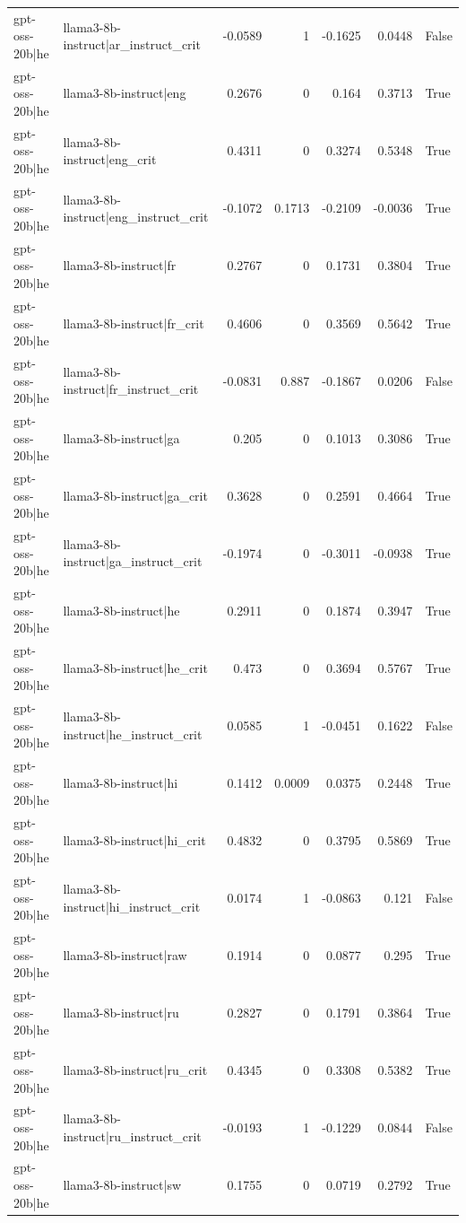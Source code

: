 \begin{table}
\begin{tabular}{l l r r r r l}
gpt-oss-20b|he & llama3-8b-instruct|ar_instruct_crit & -0.0589 & 1 & -0.1625 & 0.0448 & False \\
gpt-oss-20b|he & llama3-8b-instruct|eng & 0.2676 & 0 & 0.164 & 0.3713 & True \\
gpt-oss-20b|he & llama3-8b-instruct|eng_crit & 0.4311 & 0 & 0.3274 & 0.5348 & True \\
gpt-oss-20b|he & llama3-8b-instruct|eng_instruct_crit & -0.1072 & 0.1713 & -0.2109 & -0.0036 & True \\
gpt-oss-20b|he & llama3-8b-instruct|fr & 0.2767 & 0 & 0.1731 & 0.3804 & True \\
gpt-oss-20b|he & llama3-8b-instruct|fr_crit & 0.4606 & 0 & 0.3569 & 0.5642 & True \\
gpt-oss-20b|he & llama3-8b-instruct|fr_instruct_crit & -0.0831 & 0.887 & -0.1867 & 0.0206 & False \\
gpt-oss-20b|he & llama3-8b-instruct|ga & 0.205 & 0 & 0.1013 & 0.3086 & True \\
gpt-oss-20b|he & llama3-8b-instruct|ga_crit & 0.3628 & 0 & 0.2591 & 0.4664 & True \\
gpt-oss-20b|he & llama3-8b-instruct|ga_instruct_crit & -0.1974 & 0 & -0.3011 & -0.0938 & True \\
gpt-oss-20b|he & llama3-8b-instruct|he & 0.2911 & 0 & 0.1874 & 0.3947 & True \\
gpt-oss-20b|he & llama3-8b-instruct|he_crit & 0.473 & 0 & 0.3694 & 0.5767 & True \\
gpt-oss-20b|he & llama3-8b-instruct|he_instruct_crit & 0.0585 & 1 & -0.0451 & 0.1622 & False \\
gpt-oss-20b|he & llama3-8b-instruct|hi & 0.1412 & 0.0009 & 0.0375 & 0.2448 & True \\
gpt-oss-20b|he & llama3-8b-instruct|hi_crit & 0.4832 & 0 & 0.3795 & 0.5869 & True \\
gpt-oss-20b|he & llama3-8b-instruct|hi_instruct_crit & 0.0174 & 1 & -0.0863 & 0.121 & False \\
gpt-oss-20b|he & llama3-8b-instruct|raw & 0.1914 & 0 & 0.0877 & 0.295 & True \\
gpt-oss-20b|he & llama3-8b-instruct|ru & 0.2827 & 0 & 0.1791 & 0.3864 & True \\
gpt-oss-20b|he & llama3-8b-instruct|ru_crit & 0.4345 & 0 & 0.3308 & 0.5382 & True \\
gpt-oss-20b|he & llama3-8b-instruct|ru_instruct_crit & -0.0193 & 1 & -0.1229 & 0.0844 & False \\
gpt-oss-20b|he & llama3-8b-instruct|sw & 0.1755 & 0 & 0.0719 & 0.2792 & True \\

\end{tabular}
\end{table}
